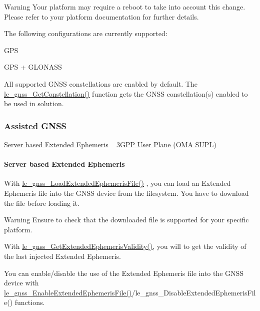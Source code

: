 \begin{DoxyWarning}{Warning}
Your platform may require a reboot to take into account this change. Please refer to your platform documentation for further details.
\end{DoxyWarning}
The following configurations are currently supported\+:
\begin{DoxyItemize}
\item G\+P\+S
\item G\+P\+S + G\+L\+O\+N\+A\+S\+S
\end{DoxyItemize}

All supported G\+N\+S\+S constellations are enabled by default. The \hyperlink{le__gnss__interface_8h_a150835481ab3751e3ab1821362e34e84}{le\+\_\+gnss\+\_\+\+Get\+Constellation()} function gets the G\+N\+S\+S constellation(s) enabled to be used in solution.\hypertarget{c_gnss_le_gnss_Assisted_GNSS}{}\subsubsection{Assisted G\+N\+S\+S}\label{c_gnss_le_gnss_Assisted_GNSS}
\hyperlink{c_gnss_le_gnss_Assisted_GNSS_EE}{Server based Extended Ephemeris} ~\newline
 \hyperlink{c_gnss_le_gnss_Assisted_GNSS_UP}{3\+G\+P\+P User Plane (O\+M\+A S\+U\+P\+L)}\hypertarget{c_gnss_le_gnss_Assisted_GNSS_EE}{}\paragraph{Server based Extended Ephemeris}\label{c_gnss_le_gnss_Assisted_GNSS_EE}
With \hyperlink{le__gnss__interface_8h_aea1811e39dfae1516b08404adfbaec22}{le\+\_\+gnss\+\_\+\+Load\+Extended\+Ephemeris\+File()} , you can load an \textquotesingle{}Extended Ephemeris\textquotesingle{} file into the G\+N\+S\+S device from the filesystem. You have to download the file before loading it. \begin{DoxyWarning}{Warning}
Ensure to check that the downloaded file is supported for your specific platform.
\end{DoxyWarning}
With \hyperlink{le__gnss__interface_8h_a1fbfc55e9e7585646fb312d7017061ff}{le\+\_\+gnss\+\_\+\+Get\+Extended\+Ephemeris\+Validity()}, you will to get the validity of the last injected Extended Ephemeris.

You can enable/disable the use of the \textquotesingle{}Extended Ephemeris\textquotesingle{} file into the G\+N\+S\+S device with \hyperlink{le__gnss__interface_8h_a3474bb912febeca6e258c6039144f39f}{le\+\_\+gnss\+\_\+\+Enable\+Extended\+Ephemeris\+File()}/le\+\_\+gnss\+\_\+\+Disable\+Extended\+Ephemeris\+File() functions.

